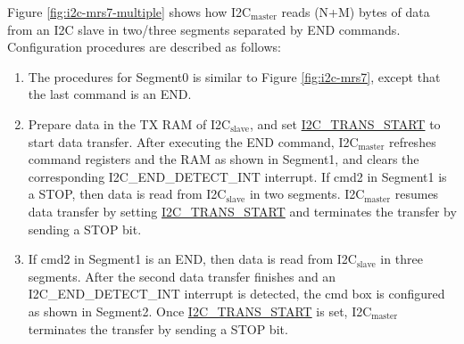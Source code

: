 \documentclass[main\_\_EN.tex]{subfiles}
\begin{document}
Figure \ref{fig:i2c-mrs7-multiple}  shows how I2C$_\text{master}$ reads (N+M) bytes of data from an I2C slave in two/three segments separated by END commands. Configuration procedures are described as follows:
\begin{enumerate}
    \item The procedures for Segment0 is similar to Figure \ref{fig:i2c-mrs7}, except that the last command is an END.
    \item Prepare data in the TX RAM of I2C$_\text{slave}$, and set \hyperref[fielddesc:I2CTRANSSTART]{I2C\_TRANS\_START} to start data transfer. After executing the END command, I2C$_\text{master}$ refreshes command registers and the RAM as shown in Segment1, and clears the corresponding I2C\_END\_DETECT\_INT interrupt. If cmd2 in Segment1 is a STOP, then data is read from I2C$_\text{slave}$ in two segments. I2C$_\text{master}$ resumes data transfer by setting \hyperref[fielddesc:I2CTRANSSTART]{I2C\_TRANS\_START} and terminates the transfer by sending a STOP bit.
    \item If cmd2 in Segment1 is an END, then data is read from I2C$_\text{slave}$ in three segments. After the second data transfer finishes and an I2C\_END\_DETECT\_INT interrupt is detected, the cmd box is configured as shown in Segment2. Once \hyperref[fielddesc:I2CTRANSSTART]{I2C\_TRANS\_START} is set, I2C$_\text{master}$ terminates the transfer by sending a STOP bit.

\end{enumerate}
\end{document}
